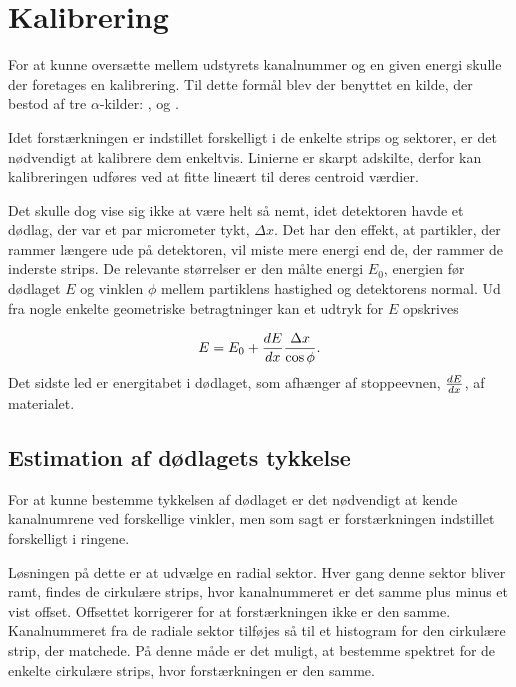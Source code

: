 \chapter{Kalibrering}
\label{cha:kalibrering}

For at kunne oversætte mellem udstyrets kanalnummer og en given energi skulle der foretages en
kalibrering. Til dette formål blev der benyttet en kilde, der bestod af tre $\alpha$-kilder:
,  og .

Idet forstærkningen er indstillet forskelligt i de enkelte strips og sektorer, er det
nødvendigt at kalibrere dem enkeltvis. Linierne er skarpt adskilte, derfor kan kalibreringen udføres
ved at fitte lineært til deres centroid værdier.  

Det skulle dog vise sig ikke at være helt så nemt, idet detektoren havde et dødlag, der var et par
micrometer tykt, $\Delta x$. Det har den effekt, at partikler, der rammer længere ude på detektoren, vil
miste mere energi end de, der rammer de inderste strips. De relevante størrelser er den målte energi
$E_{0}$, energien før dødlaget $E$ og vinklen $\phi$ mellem partiklens hastighed og detektorens
normal. Ud fra nogle enkelte geometriske betragtninger kan et udtryk for $E$ opskrives

\begin{equation}
  \label{eq:deadE}
  E = E_{0} + \frac{d E}{d x} \frac{\Delta x}{\cos \phi}  .
\end{equation}
Det sidste led er energitabet i dødlaget, som afhænger af stoppeevnen, $\frac{d E}{d x}$, af materialet.

\section{Estimation af dødlagets tykkelse}
\label{sec:dodlag}

For at kunne bestemme tykkelsen af dødlaget er det nødvendigt at kende kanalnumrene ved forskellige
vinkler, men som sagt er forstærkningen indstillet forskelligt i ringene.

Løsningen på dette er at udvælge en radial sektor. Hver gang denne sektor bliver ramt, findes de
cirkulære strips, hvor kanalnummeret er det samme plus minus et vist offset. Offsettet korrigerer
for at forstærkningen ikke er den samme. Kanalnummeret fra de radiale sektor tilføjes så til et
histogram for den cirkulære strip, der matchede. På denne måde er det muligt, at bestemme spektret
for de enkelte cirkulære strips, hvor forstærkningen er den samme.

